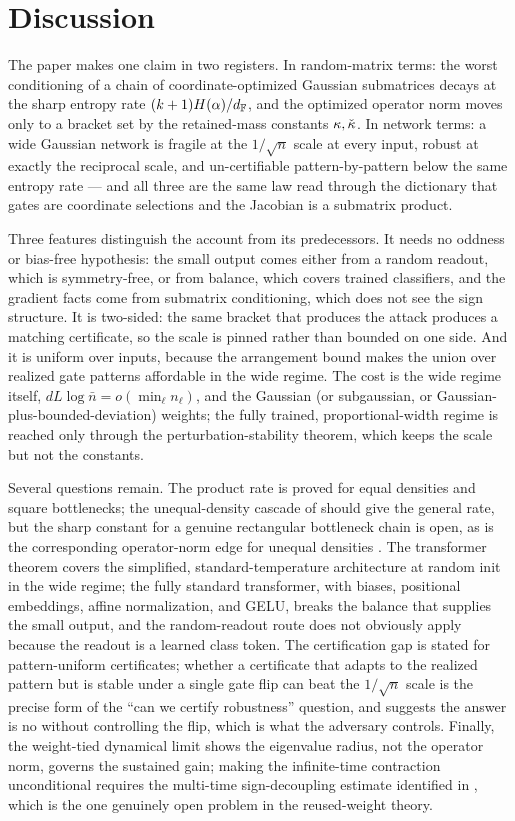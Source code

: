 \section{Discussion}\label{sec:discussion}

The paper makes one claim in two registers. In random-matrix terms: the worst conditioning of a chain
of coordinate-optimized Gaussian submatrices decays at the sharp entropy rate $(k+1)H(\alpha)/d_{\mathbb{F}}$, and
the optimized operator norm moves only to a bracket set by the retained-mass constants
$\kappa,\check{\kappa}$. In network terms: a wide Gaussian network is fragile at the $1/\sqrt n$ scale at every
input, robust at exactly the reciprocal scale, and un-certifiable pattern-by-pattern below the same
entropy rate --- and all three are the same law read through the dictionary that gates are coordinate
selections and the Jacobian is a submatrix product.

Three features distinguish the account from its predecessors. It needs no oddness or bias-free
hypothesis: the small output comes either from a random readout, which is symmetry-free, or from
balance, which covers trained classifiers, and the gradient facts come from submatrix conditioning,
which does not see the sign structure. It is two-sided: the same bracket that produces the attack
produces a matching certificate, so the scale is pinned rather than bounded on one side. And it is
uniform over inputs, because the arrangement bound makes the union over realized gate patterns
affordable in the wide regime. The cost is the wide regime itself, $dL\log\bar n=o(\min_\ell n_\ell)$,
and the Gaussian (or subgaussian, or Gaussian-plus-bounded-deviation) weights; the fully trained,
proportional-width regime is reached only through the perturbation-stability theorem, which keeps the
scale but not the constants.

Several questions remain. The product rate is proved for equal densities and square bottlenecks; the
unequal-density cascade of  should give the general rate, but the sharp constant for a
genuine rectangular bottleneck chain is open, as is the corresponding operator-norm edge for unequal
densities \cite{shmaloProducts}. The transformer theorem covers the simplified, standard-temperature
architecture at random init in the wide regime; the fully standard transformer, with biases, positional
embeddings, affine normalization, and GELU, breaks the balance that supplies the small output, and the
random-readout route does not obviously apply because the readout is a learned class token. The
certification gap is stated for pattern-uniform certificates; whether a certificate that adapts to the
realized pattern but is stable under a single gate flip can beat the $1/\sqrt n$ scale is the precise form
of the ``can we certify robustness'' question, and  suggests the answer is no
without controlling the flip, which is what the adversary controls. Finally, the weight-tied dynamical
limit shows the eigenvalue radius, not the operator norm, governs the sustained gain; making the
infinite-time contraction unconditional requires the multi-time sign-decoupling estimate identified in
\cite{relumap}, which is the one genuinely open problem in the reused-weight theory.

